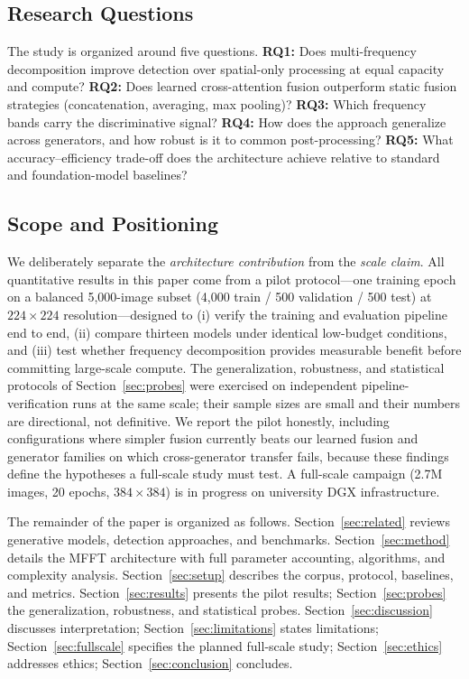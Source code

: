 \documentclass[journal]{IEEEtran}
\begin{document}
\subsection{Research Questions}
The study is organized around five questions. \textbf{RQ1:} Does multi-frequency decomposition improve detection over spatial-only processing at equal capacity and compute? \textbf{RQ2:} Does learned cross-attention fusion outperform static fusion strategies (concatenation, averaging, max pooling)? \textbf{RQ3:} Which frequency bands carry the discriminative signal? \textbf{RQ4:} How does the approach generalize across generators, and how robust is it to common post-processing? \textbf{RQ5:} What accuracy--efficiency trade-off does the architecture achieve relative to standard and foundation-model baselines?

\subsection{Scope and Positioning}
\label{sec:scope}
We deliberately separate the \emph{architecture contribution} from the \emph{scale claim}. All quantitative results in this paper come from a pilot protocol---one training epoch on a balanced 5,000-image subset (4,000 train / 500 validation / 500 test) at $224\times224$ resolution---designed to (i) verify the training and evaluation pipeline end to end, (ii) compare thirteen models under identical low-budget conditions, and (iii) test whether frequency decomposition provides measurable benefit before committing large-scale compute. The generalization, robustness, and statistical protocols of Section~\ref{sec:probes} were exercised on independent pipeline-verification runs at the same scale; their sample sizes are small and their numbers are directional, not definitive. We report the pilot honestly, including configurations where simpler fusion currently beats our learned fusion and generator families on which cross-generator transfer fails, because these findings define the hypotheses a full-scale study must test. A full-scale campaign (2.7M images, 20 epochs, $384\times384$) is in progress on university DGX infrastructure.

The remainder of the paper is organized as follows. Section~\ref{sec:related} reviews generative models, detection approaches, and benchmarks. Section~\ref{sec:method} details the MFFT architecture with full parameter accounting, algorithms, and complexity analysis. Section~\ref{sec:setup} describes the corpus, protocol, baselines, and metrics. Section~\ref{sec:results} presents the pilot results; Section~\ref{sec:probes} the generalization, robustness, and statistical probes. Section~\ref{sec:discussion} discusses interpretation; Section~\ref{sec:limitations} states limitations; Section~\ref{sec:fullscale} specifies the planned full-scale study; Section~\ref{sec:ethics} addresses ethics; Section~\ref{sec:conclusion} concludes.
\end{document}
